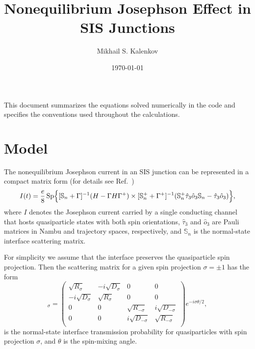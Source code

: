 \documentclass[aps,prb,amsmath,amssymb]{revtex4}
\DeclareMathOperator{\Sp}{\mathrm{Sp}}
\begin{document}
\title{Nonequilibrium Josephson Effect in SIS Junctions}
\author{Mikhail S. Kalenkov}

\date{\today}
\begin{abstract}

\end{abstract}
\maketitle

This document summarizes the equations solved numerically in the code and specifies the conventions used throughout the calculations.

\section{Model}

The nonequilibrium Josephson current in an SIS junction can be represented in a compact matrix form (for details see Ref.~)
\begin{equation}
I(t) = 
\dfrac{e}{8}
\Sp \Bigl\{
[\mathbb{S}_n + \Gamma]^{-1}
(H - \Gamma H \Gamma^+)
\\\times
[\mathbb{S}_n^+ + \Gamma^+]^{-1}(\mathbb{S}_n^+
\hat \tau_3 \hat o_3
\mathbb{S}_n - \hat \tau_3 \hat o_3)
\Bigr\},
\end{equation}
where $I$ denotes the Josephson current carried by a single conducting channel that hosts quasiparticle states with both spin orientations, $\hat \tau_3$ and $\hat o_3$ are Pauli matrices in Nambu and trajectory spaces, respectively, and $\mathbb{S}_n$ is the normal-state interface scattering matrix.

For simplicity we assume that the interface preserves the quasiparticle spin projection. Then the scattering matrix for a given spin projection $\sigma=\pm1$ has the form
\begin{equation}
[\mathbb{S}_n]_{\sigma}
=
\begin{pmatrix}
\sqrt{R_{\sigma}}  & -i \sqrt{D_{\sigma}}  &  0 & 0
\\
-i \sqrt{D_{\sigma}}  & \sqrt{R_{\sigma}}  & 0 & 0 \\
0 & 0 & \sqrt{R_{-\sigma}}  & i \sqrt{D_{-\sigma}}
\\
0 & 0 & i \sqrt{D_{-\sigma}}  & \sqrt{R_{-\sigma}}  \\
\end{pmatrix}
e^{-i\sigma\theta/2},
\end{equation}
is the normal-state interface transmission probability for quasiparticles with spin projection $\sigma$, and $\theta$ is the spin-mixing angle.
\end{document}
